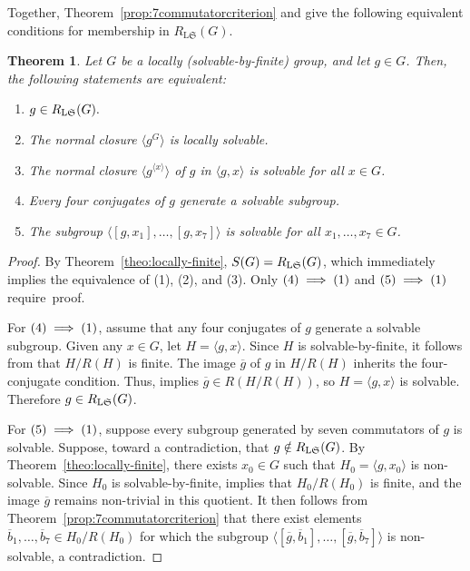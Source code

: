 \documentclass[11pt, reqno]{amsart}
\numberwithin{equation}{section}
\newtheorem{theorem}{Theorem}[section]
\theoremstyle{definition}
\numberwithin{equation}{section}
\begin{document}
Together, Theorem~\ref{prop:7commutatorcriterion} and \cite[Theorem~1.1]{Gordeev09} give the following equivalent conditions for
membership in $R_{\mathrm{L}\mathfrak S}(G)$.

\begin{theorem}\label{theo:chacoflocsolrad}
Let $G$ be a locally \textup{(\emph{solvable-by-finite})} group, and let $g \in G$. Then, the following statements are equivalent:
\begin{enumerate}[label= \textup{(\arabic*)}]
    \item $g \in R_{\textup{L}\mathfrak{S}}(G).$     \item The normal closure $\langle g^G \rangle$ is locally solvable. 
    \item The normal closure $\langle g^{\langle x \rangle} \rangle$ of $g$ in $\langle g, x \rangle$ is solvable for all $x \in G$.   
    \item Every four conjugates of $g$ generate a solvable subgroup.
    \item The subgroup $\bigl\langle [g,x_1], \ldots, [g, x_7] \bigr\rangle$ is solvable for all $x_1, \ldots, x_7 \in G$.
\end{enumerate}
\end{theorem}

\begin{proof} By Theorem~\ref{theo:locally-finite}, $S(G) = R_{\textup{L}\mathfrak{S}}(G)$, which immediately implies the equivalence of \textup{(1)}, \textup{(2)}, and \textup{(3)}. Only $\textup{(4)}\implies \textup{(1)}$ and
$\textup{(5)}\implies \textup{(1)}$ require~proof.

For $\textup{(4)} \implies \textup{(1)}$, assume that any four conjugates of $g$ generate a solvable subgroup. Given any $x \in G$, let $H = \langle g, x \rangle$. Since $H$ is solvable-by-finite, it follows from \cite[Theorem~2.8]{CNH2025} that $H/R(H)$ is finite. The image $\overline{g}$ of $g$ in $H/R(H)$ inherits the four-conjugate condition. Thus, \cite[Theorem~1.1]{Gordeev09} implies $\overline{g} \in R(H/R(H))$, so $H = \langle g, x \rangle$ is solvable. Therefore $g \in R_{\textup{L}\mathfrak{S}}(G)$.

For $\textup{(5)} \implies \textup{(1)}$, suppose every subgroup generated by seven commutators of $g$ is solvable.
Suppose, toward a contradiction, that $g \notin R_{\textup{L}\mathfrak{S}}(G)$. By Theorem~\ref{theo:locally-finite}, there exists $x_0 \in G$ such that $H_0 = \langle g, x_0 \rangle$ is non-solvable. Since $H_0$ is solvable-by-finite, \cite[Theorem~2.8]{CNH2025} implies that $H_0/R(H_0)$ is finite, and the image $\overline{g}$ remains non-trivial in this quotient. It then follows from Theorem~\ref{prop:7commutatorcriterion} that there exist elements $\overline{b}_1, \ldots, \overline{b}_7 \in H_0/R(H_0)$ for which the subgroup $\bigl\langle [\overline{g}, \overline{b}_1], \ldots, [\overline{g}, \overline{b}_7] \bigr\rangle$ is non-solvable, a contradiction.
\end{proof}
\end{document}
